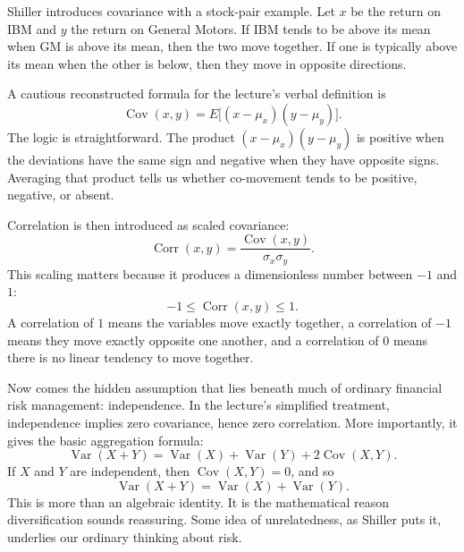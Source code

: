 Shiller introduces covariance with a stock-pair example. Let \(x\) be the return on IBM and \(y\) the return on General Motors. If IBM tends to be above its mean when GM is above its mean, then the two move together. If one is typically above its mean when the other is below, then they move in opposite directions.

A cautious reconstructed formula for the lecture's verbal definition is
\begin{equation}
\operatorname{Cov}(x,y)=E\!\big[(x-\mu_x)(y-\mu_y)\big].
\end{equation}
The logic is straightforward. The product \((x-\mu_x)(y-\mu_y)\) is positive when the deviations have the same sign and negative when they have opposite signs. Averaging that product tells us whether co-movement tends to be positive, negative, or absent.

Correlation is then introduced as scaled covariance:
\begin{equation}
\operatorname{Corr}(x,y)=\frac{\operatorname{Cov}(x,y)}{\sigma_x\sigma_y}.
\end{equation}
This scaling matters because it produces a dimensionless number between \(-1\) and \(1\):
\begin{equation}
-1\le \operatorname{Corr}(x,y)\le 1.
\end{equation}
A correlation of \(1\) means the variables move exactly together, a correlation of \(-1\) means they move exactly opposite one another, and a correlation of \(0\) means there is no linear tendency to move together.

Now comes the hidden assumption that lies beneath much of ordinary financial risk management: independence. In the lecture's simplified treatment, independence implies zero covariance, hence zero correlation. More importantly, it gives the basic aggregation formula:
\begin{equation}
\operatorname{Var}(X+Y)=\operatorname{Var}(X)+\operatorname{Var}(Y)+2\operatorname{Cov}(X,Y).
\end{equation}
If \(X\) and \(Y\) are independent, then \(\operatorname{Cov}(X,Y)=0\), and so
\begin{equation}
\operatorname{Var}(X+Y)=\operatorname{Var}(X)+\operatorname{Var}(Y).
\end{equation}
This is more than an algebraic identity. It is the mathematical reason diversification sounds reassuring. Some idea of unrelatedness, as Shiller puts it, underlies our ordinary thinking about risk.

